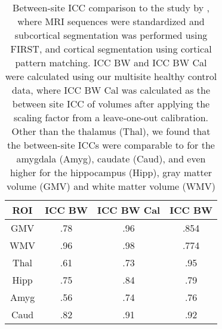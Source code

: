 \begin{table} 
    \begin{tabular}{ c c c c }
        ROI & ICC BW & ICC BW Cal & \cite{cannon2014} ICC BW \\ 
        \midrule
        GMV & .78 & .96 & .854 \\ 
        WMV & .96 & .98 & .774 \\ 
        Thal & .61 & .73 & .95 \\ 
        Hipp & .75 & .84 & .79 \\ 
        Amyg & .56 & .74 & .76 \\ 
        Caud & .82 & .91 & .92 \\ 
        \bottomrule
    \end{tabular} 
    \caption{Between-site ICC comparison to the study by \cite{cannon2014}, where MRI sequences were standardized and subcortical segmentation was performed using FIRST, and cortical segmentation using cortical pattern matching. ICC BW and ICC BW Cal were calculated using our multisite healthy control data, where ICC BW Cal was calculated as the between site ICC of volumes after applying the scaling factor from a leave-one-out calibration. Other than the thalamus (Thal), we found that the between-site ICCs were comparable to \cite{cannon2014} for the amygdala (Amyg), caudate (Caud), and even higher for the hippocampus (Hipp), gray matter volume (GMV) and white matter volume (WMV)} 
\label{comparetocannon}
\end{table}